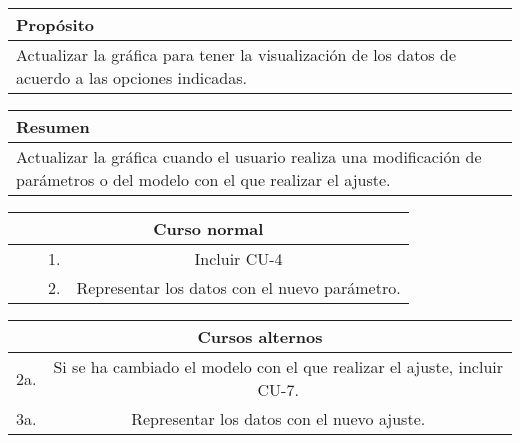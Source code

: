 \begin{table}[!h]
\begin{tabularx}{\textwidth}{|X|}
\hline
\cellcolor{cyan} \textbf{Propósito} \\
\hline
Actualizar la gráfica para tener la visualización de los datos de acuerdo a las opciones indicadas.   \\
\hline
\end{tabularx}
\end{table}

\begin{table}[!h]
\begin{tabularx}{\textwidth}{|X|}
\hline
\cellcolor{cyan} \textbf{Resumen}  \\
\hline
Actualizar la gráfica cuando el usuario realiza una modificación de parámetros o del modelo con el que realizar el ajuste.  \\
\hline
\end{tabularx}
\end{table}

\begin{table}[!h]
\begin{tabular}{|c|c|c|c|}
\hline
\multicolumn{4}{|c|}{\cellcolor{cyan} \textbf{Curso normal}} \\
\hline
              &               &      1.        &     Incluir CU-4         \\
\hline
              &               &      2.        &     Representar los datos con el nuevo parámetro.         \\
\hline
\end{tabular}
\end{table}

\begin{table}[!h]
\begin{tabular}{|c|c|}
\hline
\multicolumn{2}{|c|}{\cellcolor{cyan} \textbf{Cursos alternos}} \\
\hline
      2a.        &     Si se ha cambiado el modelo con el que realizar el ajuste, incluir CU-7.         \\
\hline
      3a.        &     Representar los datos con el nuevo ajuste.         \\
\hline
\end{tabular}
\end{table}

